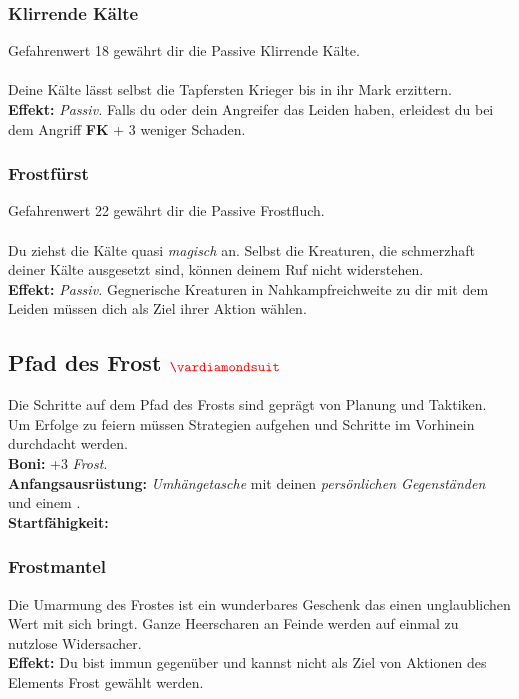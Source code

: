 \subsubsection*{ Klirrende Kälte} \label{sk:klirrende_kälte}
Gefahrenwert 18 gewährt dir die Passive Klirrende Kälte.\\
\\
Deine Kälte lässt selbst die Tapfersten Krieger bis in ihr Mark erzittern.\\
\textbf{Effekt:} \textit{Passiv.} Falls du oder dein Angreifer das Leiden  haben, erleidest du bei dem Angriff \textbf{FK} + 3 weniger Schaden.

\subsubsection*{ Frostfürst} \label{sk:Frostfürst}
Gefahrenwert 22 gewährt dir die Passive Frostfluch.\\
\\
Du ziehst die Kälte quasi \textit{magisch} an. Selbst die Kreaturen, die schmerzhaft deiner Kälte ausgesetzt sind,  können deinem Ruf nicht widerstehen.\\
\textbf{Effekt:} \textit{Passiv.} Gegnerische Kreaturen in Nahkampfreichweite zu dir mit dem Leiden  müssen dich als Ziel ihrer Aktion wählen.




\subsection*{Pfad des Frost $\Karo{}$}
Die Schritte auf dem Pfad des Frosts sind geprägt von Planung und Taktiken. Um Erfolge zu feiern müssen Strategien aufgehen und Schritte im Vorhinein durchdacht werden. \\
\textbf{Boni:} +3 \textit{ Frost}. \\
\textbf{Anfangsausrüstung:} \textit{Umhängetasche} mit deinen \textit{persönlichen Gegenständen} und einem \textit{}.\\
\textbf{Startfähigkeit:} \\

\subsubsection*{ Frostmantel} \label{sk:frostmantel}
Die Umarmung des Frostes ist ein wunderbares Geschenk das einen unglaublichen Wert mit sich bringt. Ganze Heerscharen an Feinde werden auf einmal zu nutzlose Widersacher.\\
\textbf{Effekt:} Du bist immun gegenüber  und kannst nicht als Ziel von Aktionen des Elements Frost gewählt werden.

